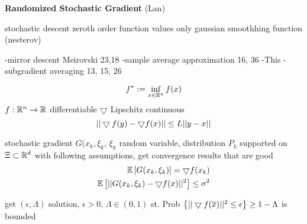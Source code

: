 \textbf{Randomized Stochastic Gradient} (Lan)

stochastic descent
zeroth order function values only
gaussian smoothhing function  (nesterov)

-mirror descent Meirovski 23,18
-sample average approximation 16, 36
-This
-subgradient averaging 13, 15, 26

\begin{equation}
f^* := \inf_{x \in \mathbb{R}^{n}} f(x)
\end{equation}
$f: \mathbb{R}^{n} \rightarrow \mathbb{R}^{}$ differentiable
$\bigtriangledown$ Lipschitz continuous
\begin{equation}
|| \bigtriangledown f(y) - \bigtriangledown f (x) || \le L || y - x ||
\end{equation}

stochastic gradient
$G (x_k, \xi_k$, $\xi_k$ random variable, distribution $P_k$ supported on $\Xi \subset \mathbb{R}^{d}$
with following assumptions, get convergence results that are good
\begin{align}
\mathbb{E} \left[ G(x_k,\xi_k) \right] = \bigtriangledown f (x_k)		\\
\mathbb{E} \left[ || G(x_k,\xi_k) - \bigtriangledown f(x)||^2 \right] \le \sigma^2
\end{align}

get $(\epsilon, \Lambda)$ solution, $\epsilon > 0$, $\Lambda \in (0,1)$
st.
Prob $\left\{ || \bigtriangledown f(\overline{x}) ||^2 \le \epsilon \right\} \ge 1-\Lambda$
is bounded
